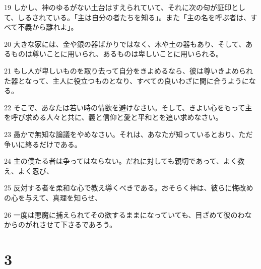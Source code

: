 \par 19 しかし、神のゆるがない土台はすえられていて、それに次の句が証印として、しるされている。「主は自分の者たちを知る」。また「主の名を呼ぶ者は、すべて不義から離れよ」。
\par 20 大きな家には、金や銀の器ばかりではなく、木や土の器もあり、そして、あるものは尊いことに用いられ、あるものは卑しいことに用いられる。
\par 21 もし人が卑しいものを取り去って自分をきよめるなら、彼は尊いきよめられた器となって、主人に役立つものとなり、すべての良いわざに間に合うようになる。
\par 22 そこで、あなたは若い時の情欲を避けなさい。そして、きよい心をもって主を呼び求める人々と共に、義と信仰と愛と平和とを追い求めなさい。
\par 23 愚かで無知な論議をやめなさい。それは、あなたが知っているとおり、ただ争いに終るだけである。
\par 24 主の僕たる者は争ってはならない。だれに対しても親切であって、よく教え、よく忍び、
\par 25 反対する者を柔和な心で教え導くべきである。おそらく神は、彼らに悔改めの心を与えて、真理を知らせ、
\par 26 一度は悪魔に捕えられてその欲するままになっていても、目ざめて彼のわなからのがれさせて下さるであろう。

\chapter{3}

